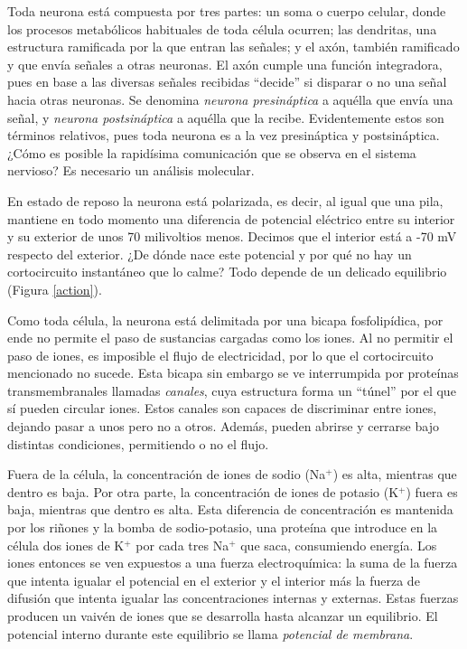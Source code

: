 Toda neurona está compuesta por tres partes: un soma o cuerpo celular, donde los procesos metabólicos habituales de toda célula ocurren; las dendritas, una estructura ramificada por la que entran las señales; y el axón, también ramificado y que envía señales a otras neuronas. El axón cumple una función integradora, pues en base a las diversas señales recibidas \enquote{decide} si disparar o no una señal hacia otras neuronas. Se denomina \textit{neurona presináptica} a aquélla que envía una señal, y \textit{neurona postsináptica} a aquélla que la recibe. Evidentemente estos son términos relativos, pues toda neurona es a la vez presináptica y postsináptica. ¿Cómo es posible la rapidísima comunicación que se observa en el sistema nervioso? Es necesario un análisis molecular.

En estado de reposo la neurona está polarizada, es decir, al igual que una pila, mantiene en todo momento una diferencia de potencial eléctrico entre su interior y su exterior de unos 70 milivoltios menos. Decimos que el interior está a -70 mV respecto del exterior. ¿De dónde nace este potencial y por qué no hay un cortocircuito instantáneo que lo calme? Todo depende de un delicado equilibrio (Figura \ref{action}).

Como toda célula, la neurona está delimitada por una bicapa fosfolipídica, por ende no permite el paso de sustancias cargadas como los iones. Al no permitir el paso de iones, es imposible el flujo de electricidad, por lo que el cortocircuito mencionado no sucede. Esta bicapa sin embargo se ve interrumpida por proteínas transmembranales llamadas \textit{canales}, cuya estructura forma un \enquote{túnel} por el que sí pueden circular iones. Estos canales son capaces de discriminar entre iones, dejando pasar a unos pero no a otros. Además, pueden abrirse y cerrarse bajo distintas condiciones, permitiendo o no el flujo.

Fuera de la célula, la concentración de iones de sodio (Na$^+$) es alta, mientras que dentro es baja. Por otra parte, la concentración de iones de potasio (K$^+$) fuera es baja, mientras que dentro es alta. Esta diferencia de concentración es mantenida por los riñones y la bomba de sodio-potasio, una proteína que introduce en la célula dos iones de K$^+$ por cada tres Na$^+$ que saca, consumiendo energía. Los iones entonces se ven expuestos a una fuerza electroquímica: la suma de la fuerza que intenta igualar el potencial en el exterior y el interior más la fuerza de difusión que intenta igualar las concentraciones internas y externas. Estas fuerzas producen un vaivén de iones que se desarrolla hasta alcanzar un equilibrio. El potencial interno durante este equilibrio se llama \textit{potencial de membrana}.

